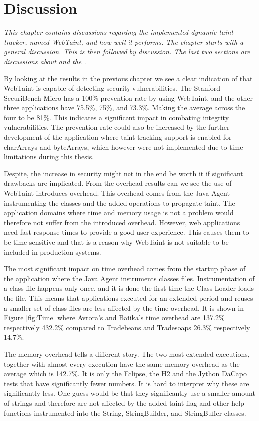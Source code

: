 \chapter{Discussion}
\label{Discussion}
\textit{This chapter contains discussions regarding the implemented dynamic taint tracker, named WebTaint, and how well it performs. The chapter starts with a general discussion. This is then followed by \textit{} discussion. The last two sections are discussions about \textit{} and the \textit{}.}

By looking at the results in the previous chapter we see a clear indication of that WebTaint is capable of detecting security vulnerabilities. The Stanford SecuriBench Micro has a 100\% prevention rate by using WebTaint, and the other three applications have 75.5\%, 75\%, and 73.3\%. Making the average across the four to be 81\%. This indicates a significant impact in combating integrity vulnerabilities. The prevention rate could also be increased by the further development of the application where taint tracking support is enabled for charArrays and byteArrays, which however were not implemented due to time limitations during this thesis.

Despite, the increase in security might not in the end be worth it if significant drawbacks are implicated. From the overhead results can we see the use of WebTaint introduces overhead. This overhead comes from the Java Agent instrumenting the classes and the added operations to propagate taint. The application domains where time and memory usage is not a problem would therefore not suffer from the introduced overhead. However, web applications need fast response times to provide a good user experience. This causes them to be time sensitive and that is a reason why WebTaint is not suitable to be included in production systems.

The most significant impact on time overhead comes from the startup phase of the application where the Java Agent instruments classes files. Instrumentation of a class file happens only once, and it is done the first time the Class Loader loads the file. This means that applications executed for an extended period and reuses a smaller set of class files are less affected by the time overhead. It is shown in Figure \ref{fig:Time} where Avrora's and Batika's time overhead are 137.2\% respectively 432.2\% compared to Tradebeans and Tradesoaps 26.3\% respectively 14.7\%.

The memory overhead tells a different story. The two most extended executions, together with almost every execution have the same memory overhead as the average which is 142.7\%. It is only the Eclipse, the H2 and the Jython DaCapo tests that have significantly fewer numbers. It is hard to interpret why these are significantly less. One guess would be that they significantly use a smaller amount of strings and therefore are not affected by the added taint flag and other help functions instrumented into the String, StringBuilder, and StringBuffer classes.




